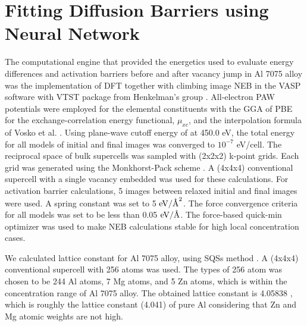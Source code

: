 \section{Fitting Diffusion Barriers using Neural Network}
\label{Chap:Al/Vac:section:NN}

The computational engine that provided the energetics used to evaluate energy differences and activation barriers before and after vacancy jump in Al 7075 alloy was the implementation of \ac{DFT} together with climbing image \acf{NEB} in the \ac{VASP} software with VTST package from Henkelman's group \cite{henkelman2000climbing,henkelman2000improved}. All-electron \ac{PAW} potentials were employed for the elemental constituents with the \ac{GGA} of \ac{PBE} for the exchange-correlation energy functional, $\mu_{xc}$, and the interpolation formula of Vosko et al. \cite{vosko1980accurate}. Using plane-wave cutoff energy of at 450.0 eV, the total energy for all models of initial and final images was converged to $10^{−7}$ eV/cell. The reciprocal space of bulk supercells was sampled with (2x2x2) k-point grids. Each grid was generated using the Monkhorst-Pack scheme \cite{monkhorst1976special}. A (4x4x4) conventional supercell with a single vacancy embedded was used for these calculations. For activation barrier calculations, 5 images between relaxed initial and final images were used. A spring constant was set to 5 $\text{eV}/\mbox{\normalfont\AA}^2$. The force convergence criteria for all models was set to be less than 0.05 $\text{eV}/\mbox{\normalfont\AA}$. The force-based quick-min optimizer was used to make \ac{NEB} calculations stable for high local concentration cases. \cite{sheppard2008optimization}


We calculated lattice constant for Al 7075 alloy, using \acfp{SQS} method \cite{zunger1990special}. A (4x4x4) conventional supercell with 256 atoms was used. The types of 256 atom was chosen to be 244 Al atoms, 7 Mg atoms, and 5 Zn atoms, which is within the concentration range of Al 7075 alloy. The obtained lattice constant is 4.05838 \angstrom, which is roughly the lattice constant (4.041\angstrom) of pure Al considering that Zn and Mg atomic weights are not high. \cite{haas2009calculation}


